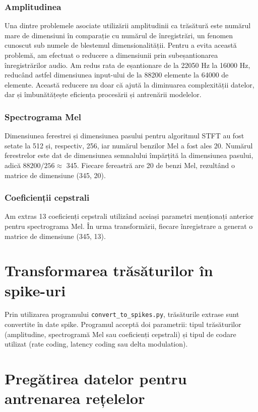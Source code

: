 \subsubsection{Amplitudinea}

Una dintre problemele asociate utilizării amplitudinii ca trăsătură este numărul mare de dimensiuni în comparație cu numărul de înregistrări, un fenomen cunoscut sub numele de blestemul dimensionalității. Pentru a evita această problemă, am efectuat o reducere a dimensiunii prin subeșantionarea înregistrărilor audio. Am redus rata de eșantionare de la 22050 Hz la 16000 Hz, reducând astfel dimensiunea input-ului de la 88200 elemente la 64000 de elemente. Această reducere nu doar că ajută la diminuarea complexității datelor, dar și îmbunătățește eficiența procesării și antrenării modelelor.


\subsubsection{Spectrograma Mel}

Dimensiunea ferestrei și dimensiunea pasului pentru algoritmul STFT au fost setate la 512 și, respectiv, 256, iar numărul benzilor Mel a fost ales 20. Numărul ferestrelor este dat de dimensiunea semnalului împărțită la dimensiunea pasului, adică $88200 / 256 \approx$ 345. Fiecare fereastră are 20 de benzi Mel, rezultând o matrice de dimensiune (345, 20).


\subsubsection{Coeficienții cepstrali}

Am extras 13 coeficienți cepstrali utilizând aceiași parametri menționați anterior pentru spectrograma Mel. În urma transformării, fiecare înregistrare a generat o matrice de dimensiune (345, 13).


\section{Transformarea trăsăturilor în spike-uri}

Prin utilizarea programului \texttt{convert\_to\_spikes.py}, trăsăturile extrase sunt convertite în date spike. Programul acceptă doi parametrii: tipul trăsăturilor (amplitudine, spectrogramă Mel sau coeficienți cepstrali) și tipul de codare utilizat (rate coding, latency coding sau delta modulation).


\section{Pregătirea datelor pentru antrenarea rețelelor}

